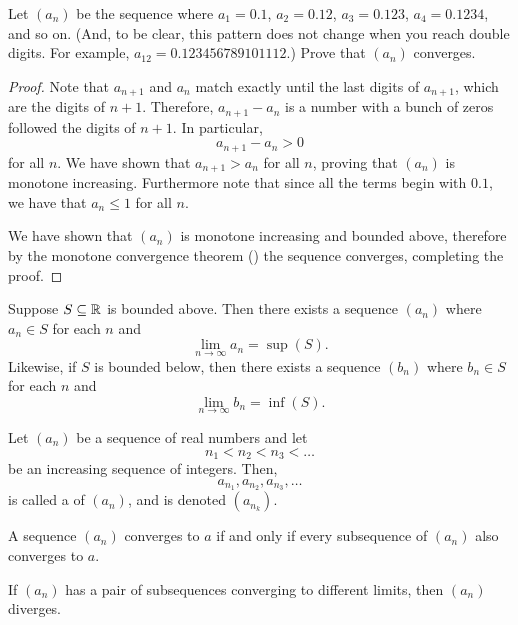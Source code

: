 \documentclass[11pt,twoside=off,numbers=noenddot]{scrbook}
\begin{document}
\begin{example}
  Let $(a_n)$ be the sequence where $a_1 = 0.1$, $a_2 = 0.12$, $a_3 =
  0.123$, $a_4 = 0.1234$, and so on. (And, to be clear, this pattern
    does not change when you reach double digits. For example, $a_{12}
  = 0.123456789101112$.) Prove that $(a_n)$ converges.

  \begin{proof}
    Note that $a_{n+1}$ and $a_n$ match exactly until the last digits
    of $a_{n+1}$, which are the digits of $n + 1$. Therefore,
    $a_{n+1} - a_n$ is a number with a bunch of zeros followed the
    digits of $n + 1$. In particular,
    \[ a_{n+1} - a_n > 0 \]
    for all $n$. We have shown that $a_{n+1} > a_n$ for all $n$,
    proving that $(a_n)$ is monotone increasing. Furthermore note
    that since all the terms begin with $0.1$, we have that $a_n \leq
    1$ for all $n$.

    We have shown that $(a_n)$ is monotone increasing and bounded
    above, therefore by the monotone convergence theorem
    () the sequence converges,
    completing the proof.
  \end{proof}
\end{example}

\begin{proposition}
  Suppose $S \subseteq \mathbb R$ is bounded above. Then there exists a
  sequence $(a_n)$ where $a_n \in S$ for each $n$ and
  \[ \lim_{n \to \infty} a_n = \sup(S). \]
  Likewise, if $S$ is bounded below, then there exists a sequence
  $(b_n)$ where $b_n \in S$ for each $n$ and
  \[ \lim_{n \to \infty} b_n = \inf(S). \]
\end{proposition}

\begin{definition}
  Let $(a_n)$ be a sequence of real numbers and let
  \[ n_1 < n_2 < n_3 < \dots \]
  be an increasing sequence of integers. Then,
  \[ a_{n_1}, a_{n_2}, a_{n_3}, \dots \]
  is called a  of $(a_n)$, and is denoted $(a_{n_k})$.
\end{definition}

\begin{proposition}
  A sequence $(a_n)$ converges to $a$ if and only if every
  subsequence of $(a_n)$ also converges to $a$.
\end{proposition}

\begin{corollary}
  If $(a_n)$ has a pair of subsequences converging to different
  limits, then $(a_n)$ diverges.
\end{corollary}
\end{document}
